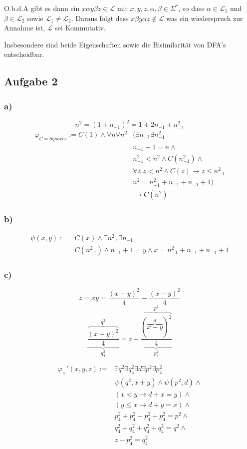 \documentclass[12pt]{article}
\begin{document}
O.b.d.A gibt es dann ein $x\alpha y\beta z\in \mathcal{L}$ mit $x,y,z,\alpha, \beta\in\Sigma^*$, so dass $\alpha\in \mathcal{L}_1$ und $\beta\in \mathcal{L}_2$ sowie $\mathcal{L}_1\neq \mathcal{L}_2$. Daraus folgt dass $x\beta y\alpha z\notin \mathcal{L}$ was
ein wiederspruch zur Annahme ist, $\mathcal{L}$ sei Kommutativ.

Insbesondere sind beide Eigenschaften sowie die Bisimilarität von DFA's entscheidbar.

\subsection*{Aufgabe 2}
\subsubsection*{a)}
\[ n^2= (1+n_{-1})^2 = 1 + 2 n_{-1} +n_{-1}^2 \]
\begin{align}
  \varphi_{C=Squares} := C(1) \land \forall n\forall n^2 &(\exists n_{-1}\exists n_{-1}^2 \\
  &n_{-1} + 1 = n \land \\
  &n_{-1}^2<n^2 \land C(n_{-1}^2) \land \\
  &\forall z. z < n^2 \land C(z) \rightarrow z\leq n_{-1}^2 \\
  &n^2 = n^2_{-1} + n_{-1} + n_{-1} + 1) \\
  &\rightarrow C(n^2)
\end{align}
\subsubsection*{b)}
\begin{align}
  \psi(x,y) :=& C(x) \land \exists n_{-1}^2\exists n_{-1} \\
  &C(n_{-1}^2) \land n_{-1}+1=y\land x = n_{-1}^2+n_{-1}+n_{-1}+1
\end{align}

\subsubsection*{c)}
\[ z = xy = \frac{(x+y)^2}{4} - \frac{(x-y)^2}{4}\]
\[ \underbrace{\frac{\overbrace{(x+y)^2}^{q^2}}{4}}_{q^2_4} = z + \underbrace{\frac{\overbrace{(\overbrace{x-y}^d)^2}^{p^2}}{4}}_{p^2_4}\]

\begin{align}
  \varphi_{\times}' (x,y,z) :=& \exists q^2 \exists q^2_4 \exists d \exists p^2 \exists p^2_4\\
  &\psi(q^2, x+y) \land \psi(p^2,d) \land \\
  &(x<y \rightarrow d+x=y) \land \\
  &(y\leq x \rightarrow d+y=x) \land \\
  &p^2_4 +p^2_4 +p^2_4 +p^2_4 = p^2 \land \\
  &q^2_4 +q^2_4 +q^2_4 +q^2_4 = q^2 \land \\
  &z+p^2_4 = q^2_4
\end{align}
\end{document}

